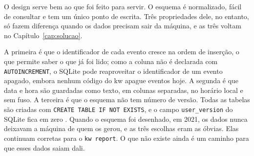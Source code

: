 O design serve bem ao que foi feito para servir. O esquema é normalizado,
fácil de consultar e tem um único ponto de escrita. Três propriedades dele,
no entanto, só fazem diferença quando os dados precisam sair da máquina, e as
três voltam no Capítulo~\ref{cap:solucao}.

A primeira é que o identificador
de cada evento cresce na ordem de inserção, o que permite saber o que já foi
lido; como a coluna não é declarada com \texttt{AUTOINCREMENT}, o SQLite pode
reaproveitar o identificador de um evento apagado, embora nenhum código do kw
apague eventos hoje. A segunda é que data e hora são guardadas como texto, em
colunas separadas, no horário local e sem fuso. A terceira é que o esquema não
tem número de versão. Todas as tabelas são criadas com \texttt{CREATE TABLE IF
NOT EXISTS}, e o campo \texttt{user\_version} do SQLite fica em zero
\citep{kworkflowrepo}. Quando o esquema foi desenhado, em 2021, os dados
nunca deixavam a máquina de quem os gerou, e as três escolhas eram as
óbvias. Elas continuam corretas para o \texttt{kw report}. O que não existe
ainda é um caminho para que esses dados saiam dali.
